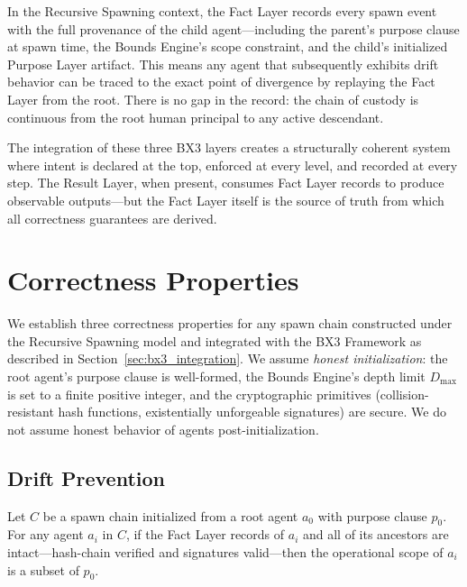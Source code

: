 In the Recursive Spawning context, the Fact Layer records every spawn event with the full provenance of the child agent—including the parent's purpose clause at spawn time, the Bounds Engine's scope constraint, and the child's initialized Purpose Layer artifact. This means any agent that subsequently exhibits drift behavior can be traced to the exact point of divergence by replaying the Fact Layer from the root. There is no gap in the record: the chain of custody is continuous from the root human principal to any active descendant.

The integration of these three BX3 layers creates a structurally coherent system where intent is declared at the top, enforced at every level, and recorded at every step. The Result Layer, when present, consumes Fact Layer records to produce observable outputs—but the Fact Layer itself is the source of truth from which all correctness guarantees are derived.

\section{Correctness Properties}
\label{sec:correctness}

We establish three correctness properties for any spawn chain constructed under the Recursive Spawning model and integrated with the BX3 Framework as described in Section~\ref{sec:bx3_integration}. We assume \emph{honest initialization}: the root agent's purpose clause is well-formed, the Bounds Engine's depth limit $D_{\max}$ is set to a finite positive integer, and the cryptographic primitives (collision-resistant hash functions, existentially unforgeable signatures) are secure. We do not assume honest behavior of agents post-initialization.

\subsection{Drift Prevention}
\label{sec:drift_prevention}

\begin{prop}
\label{prop:drift_prevention}
Let $C$ be a spawn chain initialized from a root agent $a_0$ with purpose clause $p_0$. For any agent $a_i$ in $C$, if the Fact Layer records of $a_i$ and all of its ancestors are intact—hash-chain verified and signatures valid—then the operational scope of $a_i$ is a subset of $p_0$.
\end{prop}

